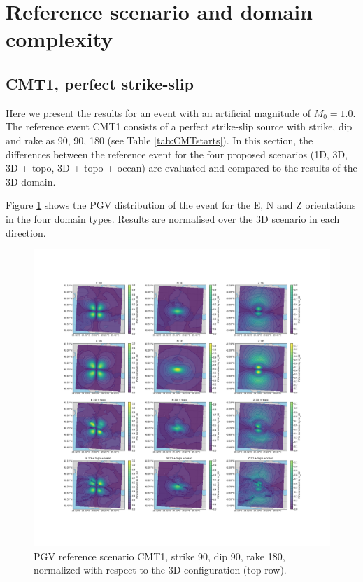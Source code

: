 \documentclass[../Text/00main.tex]{subfiles}
\begin{document}
\FloatBarrier

\section{Reference scenario and domain complexity}




\subsection{CMT1, perfect strike-slip}

Here we present the results for an event with an artificial magnitude of $M_0 = 1.0$. The reference event CMT1 consists of a perfect strike-slip source with strike, dip and rake as 90, 90, 180 (see Table \ref{tab:CMTstarts}). In this section, the differences between the reference event for the four proposed scenarios (1D, 3D, 3D + topo, 3D + topo + ocean) are evaluated and compared to the results of the 3D domain. 

Figure \ref{fig:ref_CMT1} shows the PGV distribution of the event for the E, N and Z orientations in the four domain types. Results are normalised over the 3D scenario in each direction. 

\begin{figure}[htp!]
    \centering
    \includegraphics[width=1.2\linewidth]{images_results/Ref_scenarios_normalized_sc1.png}
    \caption{PGV reference scenario CMT1, strike 90, dip 90, rake 180, normalized with respect to the 3D configuration (top row).}
    \label{fig:ref_CMT1}
\end{figure}
\end{document}
